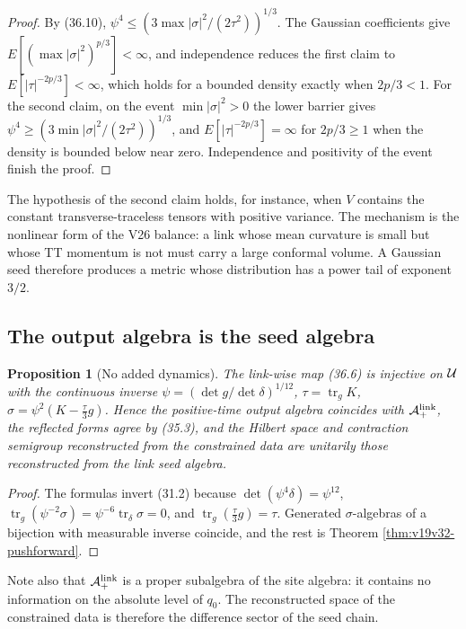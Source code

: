 \documentclass[11pt]{article}
\newtheorem{proposition}[theorem]{Proposition}
\theoremstyle{remark}
\begin{document}
\begin{proof}
By (36.10), \(\psi^4\leq(3\max|\sigma|^2/(2\tau^2))^{1/3}\).  The
Gaussian coefficients give \(E[(\max|\sigma|^2)^{p/3}]<\infty\), and
independence reduces the first claim to
\(E[|\tau|^{-2p/3}]<\infty\), which holds for a bounded density exactly
when \(2p/3<1\).  For the second claim, on the event
\(\min|\sigma|^2>0\) the lower barrier gives
\(\psi^4\geq(3\min|\sigma|^2/(2\tau^2))^{1/3}\), and
\(E[|\tau|^{-2p/3}]=\infty\) for \(2p/3\geq1\) when the density is bounded
below near zero.  Independence and positivity of the event finish the
proof.
\end{proof}

The hypothesis of the second claim holds, for instance, when \(V\)
contains the constant transverse-traceless tensors with positive
variance.  The mechanism is the nonlinear form of the V26 balance: a link
whose mean curvature is small but whose TT momentum is not must carry a
large conformal volume.  A Gaussian seed therefore produces a metric
whose distribution has a power tail of exponent \(3/2\).

\subsection{The output algebra is the seed algebra}

\begin{proposition}[No added dynamics]
\label{prop:v19v33-no-dynamics}
The link-wise map (36.6) is injective on \({\cal U}\) with the
continuous inverse
\(\psi=(\det g/\det\delta)^{1/12}\), \(\tau=\operatorname{tr}_gK\),
\(\sigma=\psi^{2}(K-\tfrac\tau3g)\).  Hence the positive-time output
algebra coincides with \({\cal A}^{\rm link}_+\), the reflected forms
agree by (35.3), and the Hilbert space and contraction semigroup
reconstructed from the constrained data are unitarily those
reconstructed from the link seed algebra.
\end{proposition}

\begin{proof}
The formulas invert (31.2) because \(\det(\psi^4\delta)=\psi^{12}\),
\(\operatorname{tr}_g(\psi^{-2}\sigma)=\psi^{-6}\operatorname{tr}_\delta\sigma=0\),
and \(\operatorname{tr}_g(\tfrac\tau3g)=\tau\).  Generated
\(\sigma\)-algebras of a bijection with measurable inverse coincide, and
the rest is Theorem \ref{thm:v19v32-pushforward}.
\end{proof}

Note also that \({\cal A}^{\rm link}_+\) is a proper subalgebra of the
site algebra: it contains no information on the absolute level of
\(q_0\).  The reconstructed space of the constrained data is therefore
the difference sector of the seed chain.
\end{document}
